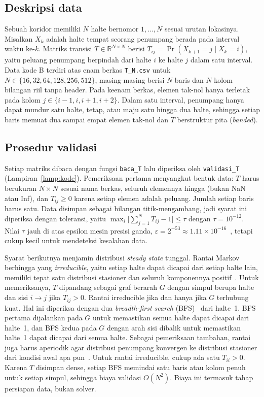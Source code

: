 \documentclass[12pt,a4paper]{article}
\newcommand{\R}{\mathbb{R}}
\numberwithin{equation}{section}
\begin{document}
\subsection{Deskripsi data}
Sebuah koridor memiliki $N$ halte bernomor $1,\dots,N$ sesuai urutan lokasinya. Misalkan $X_k$ adalah halte tempat
seorang penumpang berada pada interval waktu ke-$k$. Matriks transisi $T\in\R^{N\times N}$ berisi
$T_{ij}=\Pr(X_{k+1}=j\mid X_k=i)$, yaitu peluang penumpang berpindah dari halte $i$ ke halte $j$ dalam satu interval.
Data kode B terdiri atas enam berkas \texttt{T\_N.csv} untuk $N\in\{16,32,64,128,256,512\}$, masing-masing berisi
$N$ baris dan $N$ kolom bilangan riil tanpa header. Pada keenam berkas, elemen tak-nol hanya terletak pada kolom
$j\in\{i-1,i,i+1,i+2\}$. Dalam satu interval, penumpang hanya dapat mundur satu halte, tetap, atau maju satu hingga dua
halte, sehingga setiap baris memuat dua sampai empat elemen tak-nol dan $T$ berstruktur pita (\emph{banded}).

\subsection{Prosedur validasi}
Setiap matriks dibaca dengan fungsi \texttt{baca\_T} lalu diperiksa oleh \texttt{validasi\_T}
(Lampiran~\ref{lamp:kode}). Pemeriksaan pertama menyangkut bentuk data: $T$ harus berukuran $N\times N$ sesuai nama
berkas, seluruh elemennya hingga (bukan NaN atau Inf), dan $T_{ij}\ge0$ karena setiap elemen adalah peluang.
Jumlah setiap baris harus satu. Data disimpan sebagai bilangan titik-mengambang, jadi syarat ini diperiksa dengan
toleransi, yaitu $\max_i\bigl\lvert\sum_{j=1}^{N}T_{ij}-1\bigr\rvert\le\tau$ dengan $\tau=10^{-12}$. Nilai $\tau$
jauh di atas epsilon mesin presisi ganda, $\varepsilon=2^{-53}\approx1.11\times10^{-16}$~\cite{heath}, tetapi cukup
kecil untuk mendeteksi kesalahan data.

Syarat berikutnya menjamin distribusi \emph{steady state} tunggal. Rantai Markov berhingga yang \emph{irreducible},
yaitu setiap halte dapat dicapai dari setiap halte lain, memiliki tepat satu distribusi stasioner dan seluruh
komponennya positif~\cite{norris}. Untuk memeriksanya, $T$ dipandang sebagai graf berarah $G$ dengan simpul berupa
halte dan sisi $i\to j$ jika $T_{ij}>0$. Rantai irreducible jika dan hanya jika $G$ terhubung kuat. Hal ini
diperiksa dengan dua \emph{breadth-first search} (BFS)~\cite{cormen} dari halte~1. BFS pertama dijalankan pada $G$
untuk memastikan semua halte dapat dicapai dari halte~1, dan BFS kedua pada $G$ dengan arah sisi dibalik untuk
memastikan halte~1 dapat dicapai dari semua halte. Sebagai pemeriksaan tambahan, rantai juga harus aperiodik agar
distribusi penumpang konvergen ke distribusi stasioner dari kondisi awal apa pun~\cite{norris}. Untuk rantai
irreducible, cukup ada satu $T_{ii}>0$. Karena $T$ disimpan dense, setiap BFS memindai satu baris atau kolom penuh
untuk setiap simpul, sehingga biaya validasi $O(N^2)$. Biaya ini termasuk tahap persiapan data, bukan solver.
\end{document}
